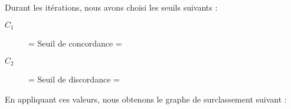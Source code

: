 \documentclass[12pt]{article}
\begin{document}
Durant les itérations, nous avons choisi les seuils suivants :
\begin{description}
\item[$C_{1}$] = Seuil de concordance = 
\item[$C_{2}$] = Seuil de discordance = 
\end{description}
En appliquant ces valeurs, nous obtenons le graphe de surclassement suivant :



\end{document}
